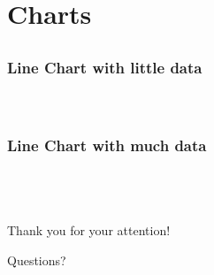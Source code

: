 \documentclass{beamer}
\begin{document}
\begin{frame}
\end{frame}

\section{Charts} 
\subsection*{}
\mdqoff
\begin{frame}\frametitle{Line Chart with little data}
	{ \centering 
	\\}
\end{frame}
\mdqon
{}



\subsection*{}
\begin{frame}\frametitle{Line Chart with much data}
	{\centering
	~%
	\\}
\end{frame}

\section*{}
\begin{frame}
\vspace{1.0cm}
	\begin{center}Thank you for your attention!\end{center}
\end{frame}

\begin{frame}
\vspace{1.0cm}
	\begin{center}Questions?\end{center}
\end{frame}
\end{document}
